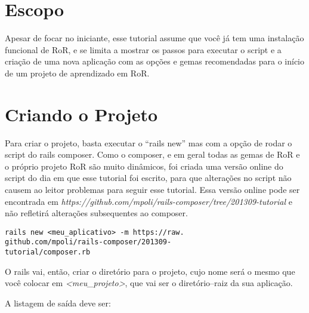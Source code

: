 \documentclass[bidi]{tufte-handout}
\begin{document}
\section{Escopo}
Apesar de focar no iniciante, esse tutorial assume que você já tem uma instalação funcional de RoR, e se limita a mostrar os passos para executar o script e a criação de uma nova aplicação com as opções e gemas recomendadas para o início de um projeto de aprendizado em RoR.

\section{Criando o Projeto}

Para criar o projeto, basta executar o ``rails new'' mas com a opção de rodar o script do rails composer. Como o composer, e em geral todas as gemas de RoR e o próprio projeto RoR são muito dinâmicos, foi criada uma versão online do script do dia em que esse tutorial foi escrito, para que alterações no script não causem ao leitor problemas para seguir esse tutorial. Essa versão online pode ser encontrada em \emph{https://github.com/mpoli/rails-composer/tree/201309-tutorial} e não refletirá alterações subsequentes ao composer.

\begin{verbatim}
rails new <meu_aplicativo> -m https://raw.
github.com/mpoli/rails-composer/201309-
tutorial/composer.rb
\end{verbatim}

O rails vai, então, criar o diretório para o projeto, cujo nome será o mesmo que você colocar em \emph{<meu\_projeto>}, que vai ser o diretório--raiz da sua aplicação.

A listagem de saída deve ser:
\end{document}
